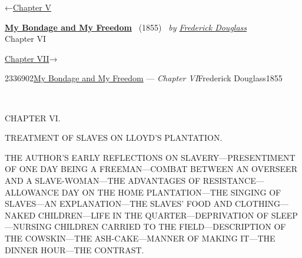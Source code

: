 \hypertarget{headerContainer}{}
\hypertarget{navigationHeader}{}
\protect\hypertarget{headerprevious}{}{←\href{/wiki/My_Bondage_and_My_Freedom_(1855)/Chapter_V}{Chapter
V}}

\textbf{\protect\hypertarget{header_title_text}{}{\href{/wiki/My_Bondage_and_My_Freedom_(1855)}{My
Bondage and My Freedom}}} ~(1855)~ \emph{by
\href{/wiki/Author:Frederick_Douglass}{\protect\hypertarget{header_author_text}{}{{Frederick
Douglass}}}}\\
\protect\hypertarget{header_section_text}{}{Chapter VI}

\protect\hypertarget{headernext}{}{\href{/wiki/My_Bondage_and_My_Freedom_(1855)/Chapter_VII}{Chapter
VII}→}

\hypertarget{navigationNotes}{}

\hypertarget{ws-data}{}
\protect\hypertarget{ws-article-id}{}{2336902}\protect\hypertarget{ws-title}{}{\href{/wiki/My_Bondage_and_My_Freedom_(1855)}{My
Bondage and My Freedom} --- \emph{Chapter
VI}}\protect\hypertarget{ws-author}{}{Frederick
Douglass}\protect\hypertarget{ws-year}{}{1855}

{\protect\hypertarget{89}{}{}}

~

{CHAPTER VI.}

TREATMENT OF SLAVES ON LLOYD'S PLANTATION.

{THE AUTHOR'S EARLY REFLECTIONS ON SLAVERY---PRESENTIMENT OF ONE DAY
BEING A FREEMAN---COMBAT BETWEEN AN OVERSEER AND A SLAVE-WOMAN---THE
ADVANTAGES OF RESISTANCE---ALLOWANCE DAY ON THE HOME PLANTATION---THE
SINGING OF SLAVES---AN EXPLANATION---THE SLAVES' FOOD AND
CLOTHING---NAKED CHILDREN---LIFE IN THE QUARTER---DEPRIVATION OF
SLEEP---NURSING CHILDREN CARRIED TO THE FIELD---DESCRIPTION OF THE
COWSKIN---THE ASH-CAKE---MANNER OF MAKING IT---THE DINNER HOUR---THE
CONTRAST.}

